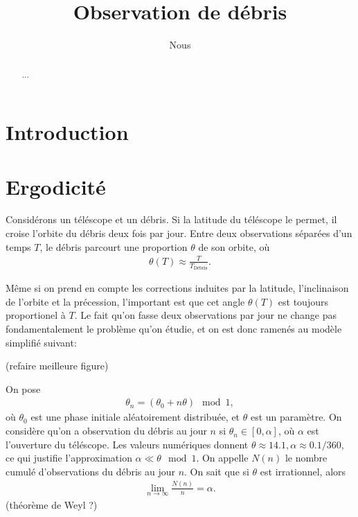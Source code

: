 \documentclass[11pt,a4paper,reqno]{article}
\author{Nous}
\begin{document}
\title{Observation de débris}

\maketitle
\begin{abstract}
  ...
\end{abstract}

\section{Introduction}
\section{Ergodicité}
Considérons un téléscope et un débris. Si la latitude du téléscope le
permet, il croise l'orbite du débris deux fois par jour. Entre deux
observations séparées d'un temps $T$, le débris parcourt une
proportion $\theta$ de son orbite, où
\begin{align*}
  \theta(T) \approx \frac T {T_{\text{Débris}}}.
\end{align*}

Même si on prend en compte les corrections induites par la latitude,
l'inclinaison de l'orbite et la précession, l'important est que cet
angle $\theta(T)$ est toujours proportionel à $T$. Le fait qu'on fasse
deux observations par jour ne change pas fondamentalement le problème
qu'on étudie, et on est donc ramenés au modèle simplifié suivant:

\begin{center}
  
  
  (refaire meilleure figure)
\end{center}

On pose
\begin{align}
  \label{modelejouet}
  \theta_{n} = (\theta_{0} + n \theta) \mod 1,
\end{align}
où $\theta_{0}$ est une phase initiale aléatoirement distribuée, et
$\theta$ est un paramètre. On considère qu'on a observation du débris
au jour $n$ si $\theta_{n} \in [0,\alpha]$, où $\alpha$ est
l'ouverture du téléscope. Les valeurs numériques donnent $\theta
\approx 14.1, \alpha \approx 0.1/360$, ce qui justifie l'approximation
$\alpha \ll \theta \mod 1$. On appelle $N(n)$ le nombre cumulé
d'observations du débris au jour $n$. On sait que si $\theta$ est
irrationnel, alors
\begin{align}
  \label{largenumbers}
  \lim_{n\to\infty} \frac{N(n)} n = \alpha.
\end{align}
(théorème de Weyl ?)
\end{document}
